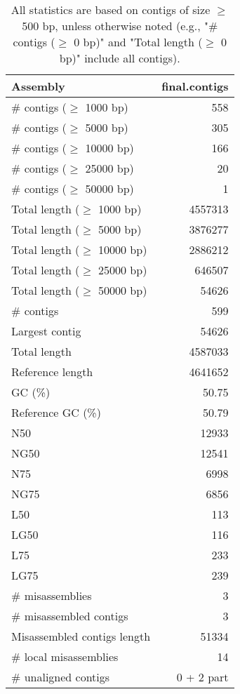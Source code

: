 \documentclass[12pt,a4paper]{article}
\begin{document}
\begin{table}[ht]
\begin{center}
\caption{All statistics are based on contigs of size $\geq$ 500 bp, unless otherwise noted (e.g., "\# contigs ($\geq$ 0 bp)" and "Total length ($\geq$ 0 bp)" include all contigs).}
\begin{tabular}{|l*{1}{|r}|}
\hline
Assembly & final.contigs \\ \hline
\# contigs ($\geq$ 1000 bp) & 558 \\ \hline
\# contigs ($\geq$ 5000 bp) & 305 \\ \hline
\# contigs ($\geq$ 10000 bp) & 166 \\ \hline
\# contigs ($\geq$ 25000 bp) & 20 \\ \hline
\# contigs ($\geq$ 50000 bp) & 1 \\ \hline
Total length ($\geq$ 1000 bp) & 4557313 \\ \hline
Total length ($\geq$ 5000 bp) & 3876277 \\ \hline
Total length ($\geq$ 10000 bp) & 2886212 \\ \hline
Total length ($\geq$ 25000 bp) & 646507 \\ \hline
Total length ($\geq$ 50000 bp) & 54626 \\ \hline
\# contigs & 599 \\ \hline
Largest contig & 54626 \\ \hline
Total length & 4587033 \\ \hline
Reference length & 4641652 \\ \hline
GC (\%) & 50.75 \\ \hline
Reference GC (\%) & 50.79 \\ \hline
N50 & 12933 \\ \hline
NG50 & 12541 \\ \hline
N75 & 6998 \\ \hline
NG75 & 6856 \\ \hline
L50 & 113 \\ \hline
LG50 & 116 \\ \hline
L75 & 233 \\ \hline
LG75 & 239 \\ \hline
\# misassemblies & 3 \\ \hline
\# misassembled contigs & 3 \\ \hline
Misassembled contigs length & 51334 \\ \hline
\# local misassemblies & 14 \\ \hline
\# unaligned contigs & 0 + 2 part \\ \hline

\end{tabular}
\end{center}
\end{table}
\end{document}
